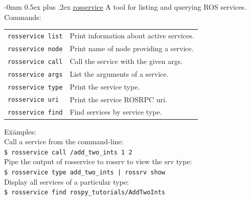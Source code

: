\documentclass[10pt,landscape]{article}
\makeatletter
\renewcommand{\subsection}{\@startsection{subsection}{2}{0mm}%
                                {-0mm}%
                                {0.5ex plus .2ex}%
                                {\normalfont\normalsize\bfseries}}
\newenvironment{nstabbing}
  {\setlength{\topsep}{1pt}%
   \setlength{\partopsep}{1pt}%
   \tabbing}
  {\endtabbing}
\makeatother
\begin{document}
\begin{multicols}{3}
\subsection{\href{http://wiki.ros.org/rosservice}{rosservice}}
\vspace{-1 mm}
A tool for listing and querying ROS services.\\
Commands: \\
\begin{tabular}{p{\the\MyLen}%
                @{}p{\linewidth-\the\MyLen}@{}}
\texttt{rosservice list}  & Print information about active services. \\
\texttt{rosservice node}  & Print name of node providing a service. \\
\texttt{rosservice call}  & Call the service with the given args. \\
\texttt{rosservice args}  & List the arguments of a service. \\
\texttt{rosservice type}  & Print the service type. \\
\texttt{rosservice uri}   & Print the service ROSRPC uri. \\
\texttt{rosservice find}  & Find services by service type.
\end{tabular}
\vspace{-1 mm}
\begin{nstabbing}
E\=x\=amples:\\
\> Call a service from the command-line:\\
\> \>\texttt{\$ rosservice call /add\_two\_ints 1 2}\\
\> Pipe the output of rosservice to rossrv to view the srv type:\\
\> \>\texttt{\$ rosservice type add\_two\_ints | rossrv show}\\
\> Display all services of a particular type:\\
\> \>\texttt{\$ rosservice find rospy\_tutorials/AddTwoInts}\\
\end{nstabbing}

\vspace{-4 mm}

\end{multicols}
\end{document}
